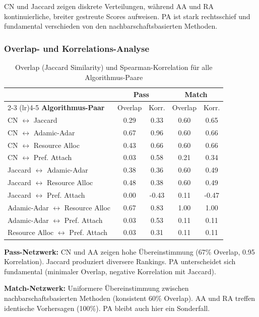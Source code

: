 CN und Jaccard zeigen diskrete Verteilungen, während AA und RA kontinuierliche, breiter gestreute Scores aufweisen. PA ist stark rechtsschief und fundamental verschieden von den nachbarschaftsbasierten Methoden.

\subsubsection{Overlap- und Korrelations-Analyse}

\begin{table}[htbp]
\centering
\small
\caption{Overlap (Jaccard Similarity) und Spearman-Korrelation für alle Algorithmus-Paare}
\label{tab:le8_overlap}
\begin{tabular}{lcccc}
\toprule
 & \multicolumn{2}{c}{\textbf{Pass}} & \multicolumn{2}{c}{\textbf{Match}} \\
\cmidrule(lr){2-3} \cmidrule(lr){4-5}
\textbf{Algorithmus-Paar} & Overlap & Korr. & Overlap & Korr. \\
\midrule
CN $\leftrightarrow$ Jaccard & 0.29 & 0.33 & 0.60 & 0.65 \\
CN $\leftrightarrow$ Adamic-Adar & 0.67 & 0.96 & 0.60 & 0.66 \\
CN $\leftrightarrow$ Resource Alloc & 0.43 & 0.66 & 0.60 & 0.66 \\
CN $\leftrightarrow$ Pref. Attach & 0.03 & 0.58 & 0.21 & 0.34 \\
Jaccard $\leftrightarrow$ Adamic-Adar & 0.38 & 0.36 & 0.60 & 0.49 \\
Jaccard $\leftrightarrow$ Resource Alloc & 0.48 & 0.38 & 0.60 & 0.49 \\
Jaccard $\leftrightarrow$ Pref. Attach & 0.00 & -0.43 & 0.11 & -0.47 \\
Adamic-Adar $\leftrightarrow$ Resource Alloc & 0.67 & 0.83 & 1.00 & 1.00 \\
Adamic-Adar $\leftrightarrow$ Pref. Attach & 0.03 & 0.53 & 0.11 & 0.11 \\
Resource Alloc $\leftrightarrow$ Pref. Attach & 0.03 & 0.31 & 0.11 & 0.11 \\
\bottomrule
\end{tabular}
\end{table}

\textbf{Pass-Netzwerk:} CN und AA zeigen hohe Übereinstimmung (67\% Overlap, 0.95 Korrelation). Jaccard produziert diversere Rankings. PA unterscheidet sich fundamental (minimaler Overlap, negative Korrelation mit Jaccard).

\textbf{Match-Netzwerk:} Uniformere Übereinstimmung zwischen nachbarschaftsbasierten Methoden (konsistent 60\% Overlap). AA und RA treffen identische Vorhersagen (100\%). PA bleibt auch hier ein Sonderfall.

